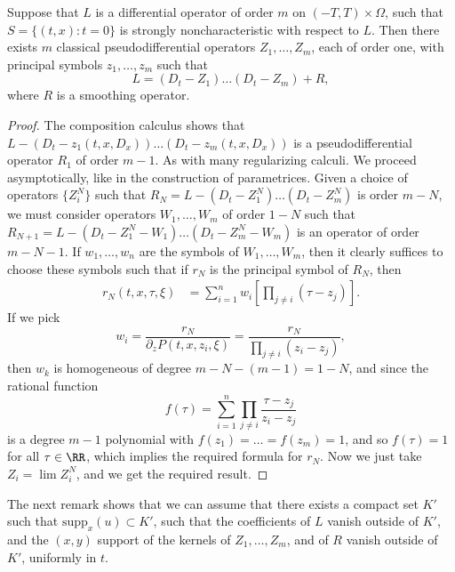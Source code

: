 \begin{lemma}
    Suppose that $L$ is a differential operator of order $m$ on $(-T,T) \times \Omega$, such that $S = \{ (t,x): t = 0 \}$ is strongly noncharacteristic with respect to $L$. Then there exists $m$ classical pseudodifferential operators $Z_1,\dots,Z_m$, each of order one, with principal symbols $z_1,\dots,z_m$ such that
    \[ L = (D_t - Z_1) \dots (D_t - Z_m) + R, \]
    where $R$ is a smoothing operator.
\end{lemma}
\begin{proof}
    The composition calculus shows that $L - (D_t - z_1(t,x,D_x)) \dots (D_t - z_m(t,x,D_x))$ is a pseudodifferential operator $R_1$ of order $m-1$. As with many regularizing calculi. We proceed asymptotically, like in the construction of parametrices. Given a choice of operators $\{ Z_i^N \}$ such that $R_N = L - (D_t - Z_1^N) \dots (D_t - Z_m^N)$ is order $m-N$, we must consider operators $W_1,\dots,W_m$ of order $1-N$ such that $R_{N+1} = L - (D_t - Z_1^N - W_1) \dots (D_t - Z_m^N - W_m)$ is an operator of order $m - N - 1$. If $w_1,\dots,w_n$ are the symbols of $W_1,\dots,W_m$, then it clearly suffices to choose these symbols such that if $r_N$ is the principal symbol of $R_N$, then
    \begin{align*}
        r_N(t,x,\tau,\xi) &= \sum_{i = 1}^n w_i \left[ \prod_{j \neq i} (\tau - z_j) \right].
    \end{align*}
    If we pick
    \[ w_i = \frac{r_N}{\partial_z P(t,x,z_i,\xi)} = \frac{r_N}{\prod_{j \neq i} (z_i - z_j)}, \]
    then $w_k$ is homogeneous of degree $m-N-(m-1) = 1-N$, and since the rational function
    \[ f(\tau) = \sum_{i = 1}^n \prod_{j \neq i} \frac{\tau - z_j}{z_i - z_j} \]
    is a degree $m-1$ polynomial with $f(z_1) = \dots = f(z_m) = 1$, and so $f(\tau) = 1$ for all $\tau \in \RR$, which implies the required formula for $r_N$. Now we just take $Z_i = \lim Z_i^N$, and we get the required result.
\end{proof}

The next remark shows that we can assume that there exists a compact set $K'$ such that $\text{supp}_x(u) \subset K'$, such that the coefficients of $L$ vanish outside of $K'$, and the $(x,y)$ support of the kernels of $Z_1,\dots,Z_m$, and of $R$ vanish outside of $K'$, uniformly in $t$.

